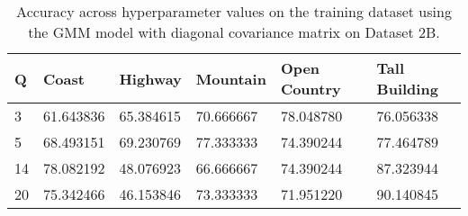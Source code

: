 \begin{table}[H]
\centering
\begin{tabular}{l l l l l l}
\hline
\hline
\textbf{Q} & \textbf{Coast} & \textbf{Highway} & \textbf{Mountain} & \textbf{Open Country} & \textbf{Tall Building} \\
\hline
\hline
3 & 61.643836 & 65.384615 & 70.666667 & 78.048780 & 76.056338 \\
5 & 68.493151 & 69.230769 & 77.333333 & 74.390244 & 77.464789 \\
14 & 78.082192 & 48.076923 & 66.666667 & 74.390244 & 87.323944 \\
20 & 75.342466 & 46.153846 & 73.333333 & 71.951220 & 90.140845 \\
\hline
\end{tabular}
\caption{Accuracy across hyperparameter values on the training dataset using the GMM model with diagonal covariance matrix on Dataset 2B.}
\label{tab:1b_full}
\end{table}
